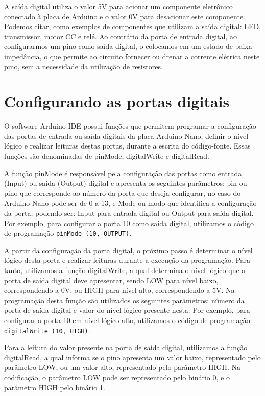 \documentclass[lang=pt,11pt]{elegantbook}
\begin{document}
A saída digital utiliza o valor 5V para acionar um componente eletrônico conectado à placa de Arduino e o valor 0V para desacionar este componente. Podemos citar, como exemplos de componentes que utilizam a saída digital: LED, transmissor, motor CC e relé. Ao contrário da porta de entrada digital, ao configurarmos um pino como saída digital, o colocamos em um estado de baixa impedância, o que permite ao circuito fornecer ou drenar a corrente elétrica neste pino,
sem a necessidade da utilização de resistores.

\section{Configurando as portas digitais}

O software Arduino IDE possui funções que permitem programar a configuração das portas de entrada ou saída digitais da placa Arduino Nano, definir o nível lógico e realizar leituras destas portas, durante a escrita do código-fonte. Essas funções são denominadas de pinMode, digitalWrite e digitalRead.

A função pinMode é responsável pela configuração das portas como entrada (Input) ou saída (Output) digital e apresenta os seguintes parâmetros: pin ou pino que corresponde ao número da porta que deseja configurar, no caso do Arduino Nano pode ser de 0 a 13, e Mode ou modo que identifica a configuração da porta, podendo ser: Input para entrada digital ou Output para saída digital. Por exemplo, para configurar a porta 10 como saída digital, utilizamos o código de programação \lstinline{pinMode (10, OUTPUT)}.

A partir da configuração da porta digital, o próximo passo é determinar o nível lógico desta porta e realizar leituras durante a execução da programação. Para tanto, utilizamos a função digitalWrite, a qual determina o nível lógico que a porta de saída digital deve apresentar, sendo LOW para nível baixo, correspondendo a 0V, ou HIGH para nível alto, correspondendo a 5V. Na programação desta função são utilizados os seguintes parâmetros: número da porta de saída digital e valor do nível lógico presente nesta. Por exemplo, para configurar a porta 10 em nível lógico alto, utilizamos o código de programação: \lstinline{digitalWrite (10, HIGH)}.

Para a leitura do valor presente na porta de saída digital, utilizamos a função digitalRead, a qual informa se o pino apresenta um valor baixo, representado pelo parâmetro LOW, ou um valor alto, representado pelo parâmetro HIGH. Na codificação, o parâmetro LOW pode ser representado pelo binário 0, e o parâmetro HIGH pelo binário 1. 
\end{document}
